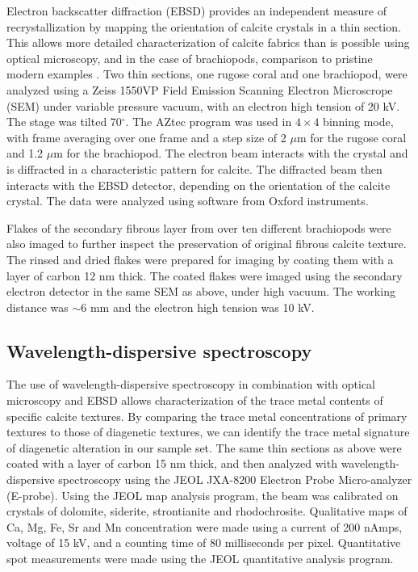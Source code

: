 \documentclass[5p, authoryear]{elsarticle}
\begin{document}
Electron backscatter diffraction (EBSD) provides an independent measure of recrystallization by mapping the orientation of calcite crystals in a thin section. This allows more detailed characterization of calcite fabrics than is possible using optical microscopy, and in the case of brachiopods, comparison to pristine modern examples \citep{PerezHuerta2007}. Two thin sections, one rugose coral and one brachiopod, were analyzed using a Zeiss 1550VP Field Emission Scanning Electron Microscrope (SEM) under variable pressure vacuum, with an electron high tension of 20 kV. The stage was tilted 70$^{\circ}$. The AZtec program was used in $4\times4$ binning mode, with frame averaging over one frame and a step size of 2 $\mu$m for the rugose coral and 1.2 $\mu$m for the brachiopod. The electron beam interacts with the crystal and is diffracted in a characteristic pattern for calcite. The diffracted beam then interacts with the EBSD detector, depending on the orientation of the calcite crystal. The data were analyzed using software from Oxford instruments.

Flakes of the secondary fibrous layer from over ten different brachiopods were also imaged to further inspect the preservation of original fibrous calcite texture. The rinsed and dried flakes were prepared for imaging by coating them with a layer of carbon 12 nm thick. The coated flakes were imaged using the secondary electron detector in the same SEM as above, under high vacuum. The working distance was $\sim 6$ mm and the electron high tension was 10 kV. 

\subsection{Wavelength-dispersive spectroscopy}

The use of wavelength-dispersive spectroscopy in combination with optical microscopy and EBSD allows characterization of the trace metal contents of specific calcite textures. By comparing the trace metal concentrations of primary textures to those of diagenetic textures, we can identify the trace metal signature of diagenetic alteration in our sample set. The same thin sections as above were coated with a layer of carbon 15 nm thick, and then analyzed with wavelength-dispersive spectroscopy using the JEOL JXA-8200 Electron Probe Micro-analyzer (E-probe). Using the JEOL map analysis program, the beam was calibrated on crystals of dolomite, siderite, strontianite and rhodochrosite. Qualitative maps of Ca, Mg, Fe, Sr and Mn concentration were made using a current of 200 nAmps, voltage of 15 kV, and a counting time of 80 milliseconds per pixel. Quantitative spot measurements were made using the JEOL quantitative analysis program. 
\end{document}
